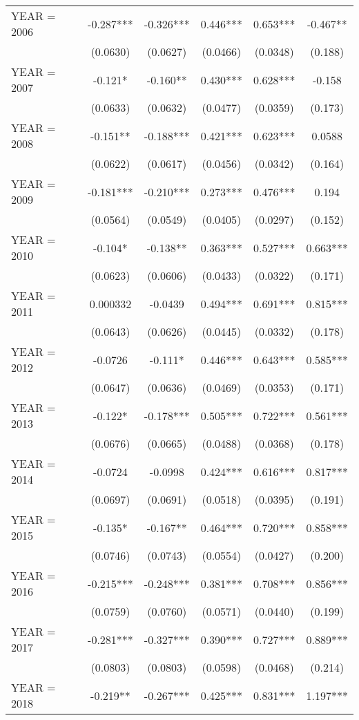 \begin{tabular}{lccccc}
YEAR = 2006 & -0.287*** & -0.326*** & 0.446*** & 0.653*** & -0.467** \\
 & (0.0630) & (0.0627) & (0.0466) & (0.0348) & (0.188) \\
YEAR = 2007 & -0.121* & -0.160** & 0.430*** & 0.628*** & -0.158 \\
 & (0.0633) & (0.0632) & (0.0477) & (0.0359) & (0.173) \\
YEAR = 2008 & -0.151** & -0.188*** & 0.421*** & 0.623*** & 0.0588 \\
 & (0.0622) & (0.0617) & (0.0456) & (0.0342) & (0.164) \\
YEAR = 2009 & -0.181*** & -0.210*** & 0.273*** & 0.476*** & 0.194 \\
 & (0.0564) & (0.0549) & (0.0405) & (0.0297) & (0.152) \\
YEAR = 2010 & -0.104* & -0.138** & 0.363*** & 0.527*** & 0.663*** \\
 & (0.0623) & (0.0606) & (0.0433) & (0.0322) & (0.171) \\
YEAR = 2011 & 0.000332 & -0.0439 & 0.494*** & 0.691*** & 0.815*** \\
 & (0.0643) & (0.0626) & (0.0445) & (0.0332) & (0.178) \\
YEAR = 2012 & -0.0726 & -0.111* & 0.446*** & 0.643*** & 0.585*** \\
 & (0.0647) & (0.0636) & (0.0469) & (0.0353) & (0.171) \\
YEAR = 2013 & -0.122* & -0.178*** & 0.505*** & 0.722*** & 0.561*** \\
 & (0.0676) & (0.0665) & (0.0488) & (0.0368) & (0.178) \\
YEAR = 2014 & -0.0724 & -0.0998 & 0.424*** & 0.616*** & 0.817*** \\
 & (0.0697) & (0.0691) & (0.0518) & (0.0395) & (0.191) \\
YEAR = 2015 & -0.135* & -0.167** & 0.464*** & 0.720*** & 0.858*** \\
 & (0.0746) & (0.0743) & (0.0554) & (0.0427) & (0.200) \\
YEAR = 2016 & -0.215*** & -0.248*** & 0.381*** & 0.708*** & 0.856*** \\
 & (0.0759) & (0.0760) & (0.0571) & (0.0440) & (0.199) \\
YEAR = 2017 & -0.281*** & -0.327*** & 0.390*** & 0.727*** & 0.889*** \\
 & (0.0803) & (0.0803) & (0.0598) & (0.0468) & (0.214) \\
YEAR = 2018 & -0.219** & -0.267*** & 0.425*** & 0.831*** & 1.197*** \\

\end{tabular}
